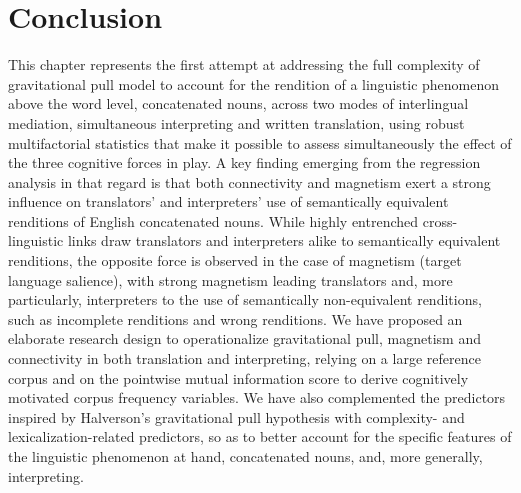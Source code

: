 \documentclass[output=paper]{langscibook}
\begin{document}
\section{Conclusion}\label{sec:lefer:5}
\largerpage[-1]
This chapter represents the first attempt at addressing the full complexity of  gravitational pull model to account for the rendition of a linguistic phenomenon above the word level, concatenated nouns, across two modes of interlingual mediation, simultaneous interpreting and written translation, using robust multifactorial statistics that make it possible to assess simultaneously the effect of the three cognitive forces in play. A key finding emerging from the regression analysis in that regard is that both connectivity and magnetism exert a strong influence on translators’ and interpreters’ use of semantically equivalent renditions of English concatenated nouns. While highly entrenched cross-linguistic links draw translators and interpreters alike to semantically equivalent renditions, the opposite force is observed in the case of magnetism (target language salience), with strong magnetism leading translators and, more particularly, interpreters to the use of semantically non-equivalent renditions, such as incomplete renditions and wrong renditions. We have proposed an elaborate research design to operationalize gravitational pull, magnetism and connectivity in both translation and interpreting, relying on a large reference corpus and on the pointwise mutual information score to derive cognitively motivated corpus frequency variables. We have also complemented the predictors inspired by Halverson’s gravitational pull hypothesis with complexity- and le\-xi\-ca\-li\-za\-tion-related predictors, so as to better account for the specific features of the linguistic phenomenon at hand, concatenated nouns, and, more generally, interpreting. 
\end{document}
